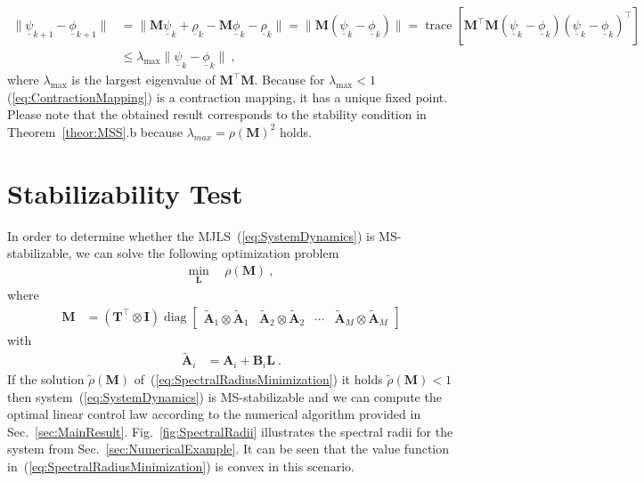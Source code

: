 \documentclass[preprint,1p,11pt]{IR-Template/ISAS_IR}
\newcommand{\nvec}[1]{\ensuremath{{{\underline{#1}}}}}
\newcommand{\mat}[1]{{\ensuremath{{\mathbf{#1}}}}}
\newcommand{\tr}{^{\top}}
\DeclareMathOperator{\ttrace}{trace}
\newcommand{\trace}[1]{\ttrace\bklammer{#1}}
\newcommand{\identitymatrix}{\mat{I}}
\newcommand{\klammer}[1]{\left( #1 \right)}
\newcommand{\bklammer}[1]{\left[ #1 \right]}
\newcommand{\kron}[2]{{#1 \otimes #2}}
\DeclareMathOperator{\diag}{diag}
\newcommand{\Asys}[1]{\mat{A}_{#1}}
\newcommand{\Bsys}[1]{\mat{B}_{#1}}
\newcommand{\Aaug}[1]{\widetilde{\mat{A}}_{#1}}
\newcommand{\bigN}[1]{\nvec{\rho}_{#1}}
\newcommand{\spectralradius}[1]{\rho\klammer{#1}}
\newcommand{\spectralradiusopt}[1]{\widetilde{\rho}\klammer{#1}}
\newcommand{\bigM}{\mat{M}}
\newcommand{\TransitionMatrix}[1]{\mat{T}_{#1}}
\newcommand{\ControlLaw}{\mat{L}}
\newcommand{\NumModes}{M}
\newcommand{\vectorizedState}[1]{\nvec{\psi}_{#1}}
\begin{document}
\begin{align*}
\|\vectorizedState{k+1} - \nvec{\phi}_{k+1}\|
	&=
	\|\bigM\vectorizedState{k} + \bigN{k} -\bigM\nvec{\phi}_{k} - \bigN{k}\|
	=
	\|\bigM(\vectorizedState{k}-\nvec{\phi}_{k})\| = \trace{\bigM\tr\bigM (\vectorizedState{k}-\nvec{\phi}_{k})(\vectorizedState{k}-\nvec{\phi}_{k})\tr}\\
	&\leq 
	\lambda_{\max} \|\vectorizedState{k} - \nvec{\phi}_{k}\|\ ,
\end{align*}
where $\lambda_{\max}$ is the largest eigenvalue of $\bigM\tr\bigM$. Because for $\lambda_{\max} < 1$ (\ref{eq:ContractionMapping}) is a contraction mapping, it has a unique fixed point.\\

Please note that the obtained result corresponds to the stability condition in Theorem~\ref{theor:MSS}.b because $\lambda_{max} = \spectralradius{\bigM}^2$ holds.    	
   \section{Stabilizability Test}
   	\label{app:StabilizabilityTest}
   	In order to determine whether the MJLS~(\ref{eq:SystemDynamics}) is MS-stabilizable, we can solve the following optimization problem
\begin{align}
\min\limits_\ControlLaw\ &\ \spectralradius{\mat{M}}\ ,
\label{eq:SpectralRadiusMinimization}
\end{align}
where
\begin{align*}
\mat{M}
	&=
	\klammer{\kron{\TransitionMatrix{}\tr}{\identitymatrix}} 
	\diag\begin{bmatrix}
		\kron{\Aaug{1}}{\Aaug{1}} & \kron{\Aaug{2}}{\Aaug{2}} & \cdots & \kron{\Aaug{\NumModes}}{\Aaug{\NumModes}}
	\end{bmatrix}
\end{align*}
with
\begin{align*}
\Aaug{i}
	&=
	\Asys{i} + \Bsys{i}\ControlLaw\ .
\end{align*}
If the solution $\spectralradiusopt{\mat{M}}$ of~(\ref{eq:SpectralRadiusMinimization}) it holds $\spectralradiusopt{\mat{M}}<1$ then system~(\ref{eq:SystemDynamics}) is MS-stabilizable and we can compute the optimal linear control law according to the numerical algorithm provided in Sec.~\ref{sec:MainResult}. Fig.~\ref{fig:SpectralRadii} illustrates the spectral radii for the system from Sec.~\ref{sec:NumericalExample}. It can be seen that the value function in~(\ref{eq:SpectralRadiusMinimization}) is convex in this scenario.\\
\end{document}
